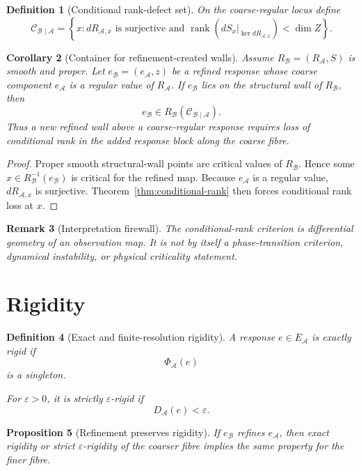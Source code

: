 \documentclass[11pt]{article}
\newtheorem{definition}{Definition}[section]
\newtheorem{proposition}[definition]{Proposition}
\newtheorem{corollary}[definition]{Corollary}
\newtheorem{remark}[definition]{Remark}
\newcommand{\Acal}{\mathcal A}
\newcommand{\Bcal}{\mathcal B}
\begin{document}
\begin{definition}[Conditional rank-defect set]
On the coarse-regular locus define
\[
\mathcal C_{\Bcal\mid\Acal}
=
\left\{
x:
dR_{\Acal,x}\text{ is surjective and }
\operatorname{rank}
\left(dS_x|_{\ker dR_{\Acal,x}}\right)
<\dim Z
\right\}.
\]
\end{definition}

\begin{corollary}[Container for refinement-created walls]
\label{cor:new-wall-container}
Assume \(R_{\Bcal}=(R_{\Acal},S)\) is smooth and proper. Let
\(e_{\Bcal}=(e_{\Acal},z)\) be a refined response whose coarse component
\(e_{\Acal}\) is a regular value of \(R_{\Acal}\). If
\(e_{\Bcal}\) lies on the structural wall of \(R_{\Bcal}\), then
\[
e_{\Bcal}\in
R_{\Bcal}(\mathcal C_{\Bcal\mid\Acal}).
\]
Thus a new refined wall above a coarse-regular response requires loss of
conditional rank in the added response block along the coarse fibre.
\end{corollary}

\begin{proof}
Proper smooth structural-wall points are critical values of
\(R_{\Bcal}\). Hence some
\(x\in R_{\Bcal}^{-1}(e_{\Bcal})\) is critical for the refined map.
Because \(e_{\Acal}\) is a regular value, \(dR_{\Acal,x}\) is
surjective. Theorem~\ref{thm:conditional-rank} then forces conditional
rank loss at \(x\).
\end{proof}

\begin{remark}[Interpretation firewall]
The conditional-rank criterion is differential geometry of an observation
map. It is not by itself a phase-transition criterion, dynamical instability,
or physical criticality statement.
\end{remark}

\section{Rigidity}

\begin{definition}[Exact and finite-resolution rigidity]
A response \(e\in E_{\Acal}\) is exactly rigid if
\[
\Phi_{\Acal}(e)
\]
is a singleton.

For \(\varepsilon>0\), it is strictly \(\varepsilon\)-rigid if
\[
D_{\Acal}(e)<\varepsilon.
\]
\end{definition}

\begin{proposition}[Refinement preserves rigidity]
If \(e_{\Bcal}\) refines \(e_{\Acal}\), then exact rigidity or strict
\(\varepsilon\)-rigidity of the coarser fibre implies the same property for
the finer fibre.
\end{proposition}
\end{document}
